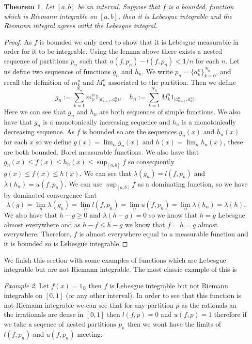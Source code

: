 \documentclass[11pt]{article}
\newtheorem{thm}{Theorem}[section]
\theoremstyle{definition}
\theoremstyle{remark}
\newtheorem{ex}[thm]{Example}
\begin{document}
\begin{thm}
Let $[a,b]$ be an interval. Suppose that $f$ is a bounded, function which is Riemann integrable on $[a,b]$, then it is Lebesgue integrable and the Riemann integral agrees witht the Lebesgue integral.
\end{thm}
\begin{proof}
As $f$ is bounded we only need to show that it is Lebesgue measurable in order for it to be integrable.
Using the lemma above there exists a nested sequence of partitions $p_n$ such that $u(f,p_n) - l(f,p_n) < 1/n$ for each $n$. Let us define two sequences of functions $g_n$ and $h_n$. We write $p_n = \{ a^n_k \}_{k=0}^{N_n}$, and recall the definition of $m^n_k$ and $M^n_k$ associated to the partition. Then we define
\[ g_n:= \sum_{k=1}^{N_n} m^n_k 1_{[a_{k-1}^n, a_k^n)}, \quad h_n :=\sum_{k=1}^{N_n} M^n_k 1_{[a_{k-1}^n, a_k^n)}.\] Here we can see that $g_n$ and $h_n$ are both sequences of simple functions. We also have that $g_n$ is a monotonically increasing sequence and $h_n$ is a monotonically decreasing sequence. As $f$ is bounded so are the sequences $g_n(x)$ and $h_n(x)$ for each $x$ so we define $g(x) = \lim_n g_n(x)$ and $h(x) = \lim_n h_n(x)$, these are both bounded, Borel measurable functions. We also have that $g_n(x) \leq f(x) \leq h_n(x) \leq \sup_{[a,b]} f$ so consequently $g(x) \leq f(x) \leq h(x)$. We can see that $\lambda(g_n) = l(f,p_n)$ and $\lambda(h_n) = u(f,p_n)$. We can use $\sup_{[a,b]}f$ as a dominating function, so we have by dominated convergence that
\[ \lambda (g) = \lim_n \lambda(g_n) = \lim_n l(f,p_n) = \lim_n u(f,p_n) = \lim_n \lambda(h_n) = \lambda(h). \] We also have that $h-g \geq 0$ and $\lambda(h-g) = 0$ so we know that $h=g$ Lebesgue almost everywhere and as $h-f \leq h-g$ we know that $f=h=g$ almost everywhere. Therefore, $f$ is almost everywhere equal to a measurable function and it is bounded so is Lebesgue integrable
\end{proof}
We finish this section with some examples of functions which are Lebesgue integrable but are not Riemann integrable. The most classic example of this is 
\begin{ex}
Let $f(x) = 1_\mathbb{Q}$ then $f$ is Lebesgue integrable but not Riemann integrable on $[0,1]$ (or any other interval). In order to see that this function is not Riemann integrable we can see that for any partition $p$ as the rationals an the irrationals are dense in $[0,1]$ then $l(f,p) =0$ and $u(f,p) =1$ therefore if we take a seqence of nested partitions $p_n$ then we wont have the limits of $l(f,p_n)$ and $u(f,p_n)$ meeting.
\end{ex}
\end{document}
